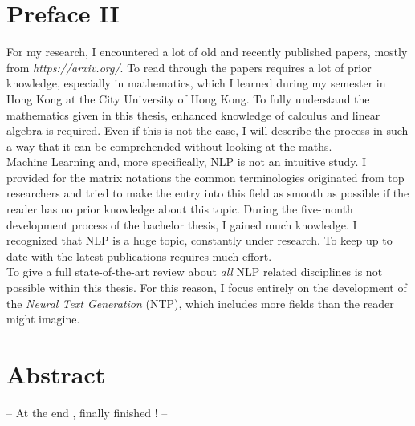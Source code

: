 \section*{Preface II}
\label{sec:prolog_2}
For my research, I encountered a lot of old and recently published papers, mostly from \textit{https://arxiv.org/}. 
To read through the papers requires a lot of prior knowledge, especially in mathematics, which I learned during my semester in Hong Kong at the City University of Hong Kong. 
To fully understand the mathematics given in this thesis, enhanced knowledge of calculus and linear algebra is required. Even if this is not the case, I will describe the process in such a way that it can be comprehended without looking at the maths. \\
Machine Learning and, more specifically, NLP is not an intuitive study. I provided for the matrix notations the common terminologies originated from top researchers and tried to make the entry into this field as smooth as possible if the reader has no prior knowledge about this topic.
During the five-month development process of the bachelor thesis, I gained much knowledge. I recognized that NLP is a huge topic, constantly under research. To keep up to date with the latest publications requires much effort. \\
To give a full state-of-the-art review about \textit{all} NLP related disciplines is not possible within this thesis. For this reason, I focus entirely on the development of the \textit{Neural Text Generation} (NTP), which includes more fields than the reader might imagine.




\section*{Abstract}
\label{sec:abstract}

-- At the end , finally finished ! --
